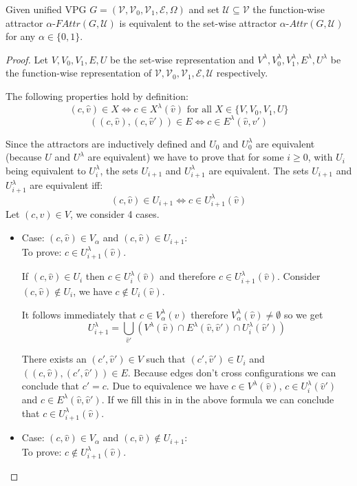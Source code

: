\begin{lemma}
	\label{lem_attr_equal}
	Given unified VPG $G = (\mathcal{V},\mathcal{V}_0,\mathcal{V}_1, \mathcal{E}, \Omega)$ and set $\mathcal{U} \subseteq \mathcal{V}$ the function-wise attractor $\alpha\textit{-FAttr}(G,\mathcal{U})$ is equivalent to the set-wise attractor $\alpha\textit{-Attr}(G,\mathcal{U})$ for any $\alpha \in \{0,1\}$.
	\begin{proof}
		Let $V,V_0,V_1,E,U$ be the set-wise representation and $V^\lambda,V_0^\lambda,V_1^\lambda,E^\lambda,U^\lambda$ be the function-wise representation of $\mathcal{V},\mathcal{V}_0,\mathcal{V}_1,\mathcal{E},\mathcal{U}$ respectively.
		
		The following properties hold by definition:
		\[ (c,\hat{v}) \in X \iff c \in X^\lambda(\hat{v})\text{ for all } X\in \{V,V_0,V_1,U\}\]
		\[ ((c,\hat{v}),(c,\hat{v}')) \in E \iff c \in E^\lambda(\hat{v},\hat{v}') \]
		
		Since the attractors are inductively defined and $U_0$ and $U^\lambda_0$ are equivalent (because $U$ and $U^\lambda$ are equivalent) we have to prove that for some $i \geq 0$, with $U_i$ being equivalent to $U^\lambda_i$, the sets $U_{i+1}$ and $U^\lambda_{i+1}$ are equivalent. The sets $U_{i+1}$ and $U^\lambda_{i+1}$ are equivalent iff:
		\[ (c,\hat{v}) \in U_{i+1} \iff c \in U^\lambda_{i+1}(\hat{v}) \]
		Let $(c,\hat{v}) \in V$, we consider 4 cases.
		\begin{itemize}
			\item Case: $(c, \hat{v}) \in V_{\alpha}$ and $(c,\hat{v}) \in U_{i+1}$:\\
			To prove: $c \in U^\lambda_{i+1}(\hat{v})$.
			
			If $(c,\hat{v}) \in U_i$ then $c \in U^\lambda_i(\hat{v})$ and therefore $c \in U^\lambda_{i+1}(\hat{v})$. Consider $(c,\hat{v}) \notin U_i$, we have $c \notin U_i(\hat{v})$.
			
			
			It follows immediately that $c \in V^\lambda_{\alpha}(\hat{v})$ therefore $V^\lambda_{\alpha}(\hat{v}) \neq \emptyset$ so we get
			\[ U^\lambda_{i+1} =\bigcup_{\hat{v}'} (V^\lambda(\hat{v}) \cap E^\lambda(\hat{v},\hat{v}') \cap U^\lambda_i(\hat{v}')) \]
			
			There exists an $(c',\hat{v}') \in V$ such that $(c',\hat{v}') \in U_i$ and $((c,\hat{v}),(c',\hat{v}')) \in E$. Because edges don't cross configurations we can conclude that $c' = c$. Due to equivalence we have $c \in V^\lambda(\hat{v})$, $c \in U^\lambda_i(\hat{v}')$ and $c \in E^\lambda(\hat{v},\hat{v}')$. If we fill this in in the above formula we can conclude that $c \in U^\lambda_{i+1}(\hat{v})$.
			\item Case: $(c, \hat{v}) \in V_{\alpha}$ and $(c,\hat{v}) \notin U_{i+1}$:\\
			To prove: $c \notin U^\lambda_{i+1}(\hat{v})$.
			

\end{itemize}
\end{proof}
\end{lemma}
